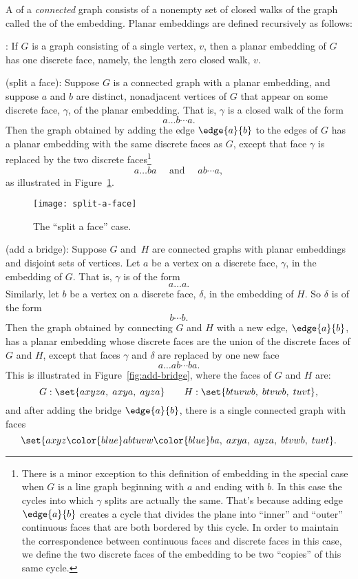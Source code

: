 \begin{definition}\label{def:embedding}\label{embeddingdef}
A  of a \emph{connected} graph consists of a
nonempty set of closed walks of the graph called the  of the embedding.  Planar embeddings are defined recursively
as follows:

: If $G$ is a graph consisting of a single
vertex, $v$, then a planar embedding of $G$ has one discrete face,
namely, the length zero closed walk, $v$.

 (split a face): Suppose $G$ is a
connected graph with a planar embedding, and suppose $a$ and $b$ are
distinct, nonadjacent vertices of $G$ that appear on some discrete
face, $\gamma$, of the planar embedding.  That is, $\gamma$ is a
closed walk of the form
\[
a \dots b \cdots a.
\]
Then the graph obtained by adding the edge $\edge{a}{b}$ to the edges of
$G$ has a planar embedding with the same discrete faces as $G$, except
that face $\gamma$ is replaced by the two discrete
faces\footnote{\label{C} There is a minor exception to this definition of
  embedding in the special case when $G$ is a line graph beginning with
  $a$ and ending with $b$.  In this case the cycles into which $\gamma$
  splits are actually the same.  That's because adding edge $\edge{a}{b}$
  creates a cycle that divides the plane into ``inner'' and ``outer''
  continuous faces that are both bordered by this cycle.  In order to
  maintain the correspondence between continuous faces and discrete faces
  in this case, we define the two discrete faces of the embedding to be
  two ``copies'' of this same cycle.}
\[
a\dots ba\quad \text{ and } \quad ab\cdots a,
\]
as illustrated in Figure~\ref{fig:face-splitting}.

\begin{figure}\redrawn

\texttt{[image: split-a-face]}

\caption{The ``split a face'' case.}
\label{fig:face-splitting}
\end{figure}

 (add a bridge): Suppose $G$ and~$H$
are connected graphs with planar embeddings and disjoint sets of
vertices.  Let $a$ be a vertex on a discrete face, $\gamma$, in the
embedding of $G$.  That is, $\gamma$ is of the form
\[
a\dots a.
\]
Similarly, let $b$ be a vertex on a discrete face, $\delta$, in the
embedding of $H$.  So $\delta$ is of the form
\[
b\cdots b.
\]
Then the graph obtained by connecting $G$ and $H$ with a new edge,
$\edge{a}{b}$, has a planar embedding whose discrete faces are the union of
the discrete faces of $G$ and $H$, except that faces $\gamma$ and $\delta$
are replaced by one new face
\[
a\dots ab\cdots ba.
\]
This is illustrated in Figure~\ref{fig:add-bridge}, where the faces of
$G$ and $H$ are:
\[
G: \set{ axyza,\; axya,\; ayza }
    \qquad H: \set{ btuvwb,\; btvwb,\; tuvt },
\]
and after adding the bridge $\edge{a}{b}$, there is a
single connected graph with faces
\[
\set{ axyz{\color{blue}ab}tuvw{\color{blue}ba},\;
         axya,\; ayza,\; btvwb,\; tuvt }.
\]


\end{definition}
